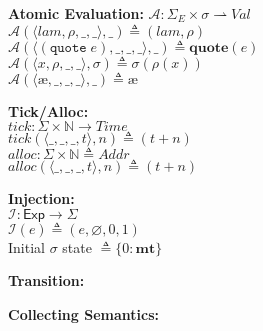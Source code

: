 \documentclass[12pt,draft]{article}
\newcommand\mae{\ensuremath{\text{\ae}}}
\newcommand{\quotesyn}[1]{(\texttt{quote}\;#1)}
\begin{document}
\begin{multicols*}{2}
\begin{center}
\end{center}
\vspace{-10mm}
\begin{center}
\textbf{Atomic Evaluation:}
$ \mathcal{A} : \Sigma_E \times \sigma \rightharpoonup \textit{Val} $ \\
$ \mathcal{A}( \langle lam , \rho , \_ , \_ \rangle, \_) 
			\triangleq (lam , \rho) $ \\
$ \mathcal{A}( \langle \quotesyn{e} , \_ , \_ , \_ \rangle, \_) 
			\triangleq \textbf{quote}(e) $ \\
$ \mathcal{A}( \langle x , \rho , \_ , \_ \rangle, \sigma) 
			\triangleq \sigma(\rho(x)) $ \\
$ \mathcal{A}( \langle \mae , \_ , \_ , \_ \rangle, \_) 
			\triangleq \mae $ \\
\end{center}
\vspace{-10mm}
\begin{center}
\textbf{Tick/Alloc:} \\
$ tick : \Sigma \times \mathbb{N} \rightarrow \textit{Time} $ \\
$ tick(\langle \_, \_ , \_, t \rangle, n) \triangleq (t + n) $ \\
$ alloc : \Sigma \times \mathbb{N} \triangleq \textit{Addr} $ \\
$ alloc(\langle \_, \_ , \_, t \rangle, n) \triangleq (t + n) $ \\
\end{center}
\vspace{-10mm}
\begin{center}
\textbf{Injection:} \\
$\mathcal{I} : \textsf{Exp} \rightarrow \Sigma $ \\
$ \mathcal{I}(e) \triangleq (e , \varnothing , 0 , 1)$ \\
Initial $\sigma$ state $\triangleq \{ 0 : \textbf{mt} \} $ \\
\end{center}
\vspace{-10mm}
\begin{center}
\textbf{Transition:}
\end{center}
\vspace{-10mm}
\begin{center}
\textbf{Collecting Semantics:}
\end{center}
\vspace{-10mm}



\end{multicols*}
\end{document}
